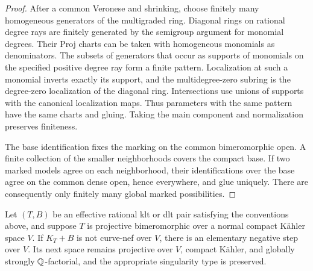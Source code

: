 \begin{proof}
After a common Veronese and shrinking, choose finitely many homogeneous
generators of the multigraded ring.  Diagonal rings on rational degree
rays are finitely generated by the semigroup argument for monomial
degrees.  Their Proj charts can be taken with homogeneous monomials as
denominators.  The subsets of generators that occur as supports of
monomials on the specified positive degree ray form a finite pattern.
Localization at such a monomial inverts exactly its support, and the
multidegree-zero subring is the degree-zero localization of the
diagonal ring.  Intersections use unions of supports with the
canonical localization maps.  Thus parameters with the same pattern
have the same charts and gluing.  Taking the main component and
normalization preserves finiteness.

The base identification fixes the marking on the common bimeromorphic
open.  A finite collection of the smaller neighborhoods covers the
compact base.  If two marked models agree on each neighborhood, their
identifications over the base agree on the common dense open, hence
everywhere, and glue uniquely.  There are consequently only finitely
many global marked possibilities.
\end{proof}

\begin{proposition}
\label{bir:continuation}
Let $(T,B)$ be an effective rational klt or dlt pair satisfying the
conventions above, and suppose $T$ is projective bimeromorphic over a
normal compact K\"ahler space $V$.  If $K_T+B$ is not curve-nef over
$V$, there is an elementary negative step over $V$.  Its next space
remains projective over $V$, compact K\"ahler, and globally strongly
$\mathbb{Q}$-factorial, and the appropriate singularity type is preserved.
\end{proposition}

